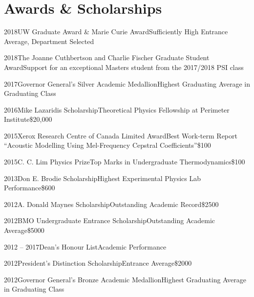 \documentclass{article}
\begin{document}
    \section{Awards \& Scholarships}
    \begin{awardlist}
        \item{2018}{UW Graduate Award \& Marie Curie Award}{Sufficiently High Entrance Average, Department Selected}{}
        \item{2018}{The Joanne Cuthbertson and Charlie Fischer Graduate Student Award}{Support for an exceptional Masters student from the 2017/2018 PSI class}{}
        \item{2017}{Governor General's Silver Academic Medallion}{Highest Graduating Average in Graduating Class}{}
        \item{2016}{Mike Lazaridis Scholarship}{Theoretical Physics Fellowship at Perimeter Institute}{\$20,000}
        \item{2015}{Xerox Research Centre of Canada Limited Award}{Best Work-term Report ``Acoustic Modelling Using Mel-Frequency Cepstral Coefficients''}{\$100}
        \item{2015}{C. C. Lim Physics Prize}{Top Marks in Undergraduate Thermodynamics}{\$100}
        \item{2013}{Don E. Brodie Scholarship}{Highest Experimental Physics Lab Performance}{\$600}
        \item{2012}{A. Donald Maynes Scholarship}{Outstanding Academic Record}{\$2500}
        \item{2012}{BMO Undergraduate Entrance Scholarship}{Outstanding Academic Average}{\$5000}
        \item{2012 -- 2017}{Dean's Honour List}{Academic Performance}{}
        \item{2012}{President's Distinction Scholarship}{Entrance Average}{\$2000}
        \item{2012}{Governor General's Bronze Academic Medallion}{Highest Graduating Average in Graduating Class}{}
    \end{awardlist}
    \clearpage
\end{document}
